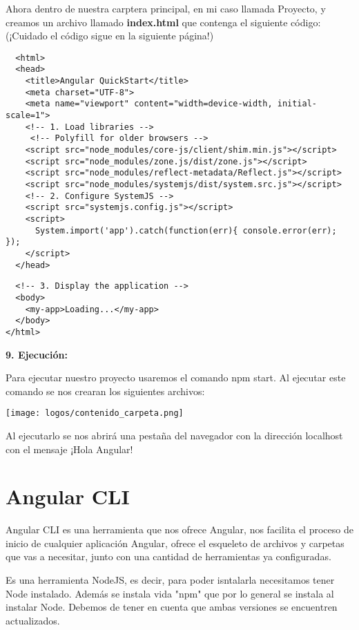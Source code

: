 \documentclass[openany]{book}
\begin{document}
Ahora dentro de nuestra carptera principal, en mi caso llamada Proyecto, y creamos un archivo llamado \textbf{index.html} que contenga el siguiente código: (¡Cuidado el código sigue en la siguiente página!)
\begin{lstlisting}
  <html>
  <head>
    <title>Angular QuickStart</title>
    <meta charset="UTF-8">
    <meta name="viewport" content="width=device-width, initial-scale=1">
    <!-- 1. Load libraries -->
     <!-- Polyfill for older browsers -->
    <script src="node_modules/core-js/client/shim.min.js"></script>
    <script src="node_modules/zone.js/dist/zone.js"></script>
    <script src="node_modules/reflect-metadata/Reflect.js"></script>
    <script src="node_modules/systemjs/dist/system.src.js"></script>
    <!-- 2. Configure SystemJS -->
    <script src="systemjs.config.js"></script>
    <script>
      System.import('app').catch(function(err){ console.error(err); });
    </script>
  </head>
\end{lstlisting}
  \pagebreak 
  \vspace*{5\baselineskip}
  \begin{lstlisting}
  <!-- 3. Display the application -->
  <body>
    <my-app>Loading...</my-app>
  </body>
</html>
\end{lstlisting}

\textbf{9. Ejecución: }

Para ejecutar nuestro proyecto usaremos el comando npm start. Al ejecutar este comando se nos crearan los siguientes archivos:
\begin{center}
  \texttt{[image: logos/contenido\_carpeta.png]}
\end{center}
Al ejecutarlo se nos abrirá una pestaña del navegador con la dirección localhost con el mensaje ¡Hola Angular!

\chapter{Angular CLI}
Angular CLI es una herramienta que nos ofrece Angular, nos facilita el proceso de inicio de cualquier aplicación Angular, ofrece el esqueleto de archivos y carpetas que vas a necesitar, junto con una cantidad de herramientas ya configuradas.  

Es una herramienta NodeJS, es decir, para poder isntalarla necesitamos tener Node instalado. Además se instala vida "npm" que por lo general se instala al instalar Node. Debemos de tener en cuenta que ambas versiones se encuentren actualizados. 
\end{document}
